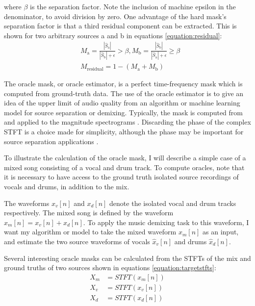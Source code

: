 \documentclass[report.tex]{subfiles}
\begin{document}
where $\beta$ is the separation factor. Note the inclusion of machine epsilon in the denominator, to avoid division by zero. One advantage of the hard mask's separation factor is that a third residual component can be extracted. This is shown for two arbitrary sources a and b in equations \eqref{equation:residual}:
\begin{align}\tag{23}\label{equation:residual}
	\nonumber & M_{\text{a}} = \frac{|\hat{S}_{\text{a}}|}{|\hat{S}_{\text{b}}| + \epsilon} > \beta, M_{\text{b}} = \frac{|\hat{S}_{\text{b}}|}{|\hat{S}_{\text{a}}| + \epsilon} \ge \beta\\
	\nonumber & M_{\text{residual}} = 1 - (M_{\text{a}} + M_{\text{b}})
\end{align}

The oracle mask, or oracle estimator, is a perfect time-frequency mask which is computed from ground-truth data. The use of the oracle estimator is to give an idea of the upper limit of audio quality from an algorithm or machine learning model for source separation or demixing. Typically, the mask is computed from and applied to the magnitude spectrograms \parencite{fitzgerald1, fitzgerald2, driedger, umx, plumbley1, plumbley2}. Discarding the phase of the complex STFT is a choice made for simplicity, although the phase may be important for source separation applications \parencite{ditchphase}.

To illustrate the calculation of the oracle mask, I will describe a simple case of a mixed song consisting of a vocal and drum track. To compute oracles, note that it is necessary to have access to the ground truth isolated source recordings of vocals and drums, in addition to the mix.

The waveforms $x_{v}[n]$ and $x_{d}[n]$ denote the isolated vocal and drum tracks respectively. The mixed song is defined by the waveform $x_{m}[n] = x_{v}[n] + x_{d}[n]$. To apply the music demixing task to this waveform, I want my algorithm or model to take the mixed waveform $x_{m}[n]$ as an input, and estimate the two source waveforms of vocals $\hat{x}_{v}[n]$ and drums $\hat{x}_{d}[n]$.

Several interesting oracle masks can be calculated from the STFTs of the mix and ground truths of two sources shown in equations \eqref{equation:targetstfts}:
\begin{align}\tag{24}\label{equation:targetstfts}
	\nonumber X_{m} &= \mathit{STFT}(x_{m}[n])\\
	\nonumber X_{v} &= \mathit{STFT}(x_{v}[n])\\
	\nonumber X_{d} &= \mathit{STFT}(x_{d}[n])
\end{align}
 
\end{document}
